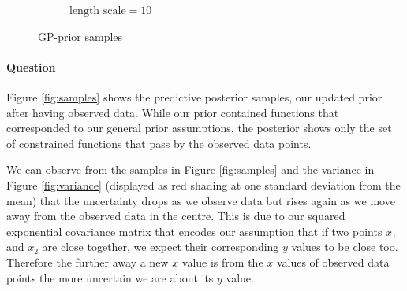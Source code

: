 \documentclass{article}
\newcounter{question}
\newcommand{\question}{\stepcounter{question}\paragraph{Question \thequestion}}
\begin{document}
\begin{figure}[H]
\begin{subfigure}[t]{0.3\linewidth}
		\caption{$\text{length scale} = 10$}
		\label{fig:10.l}
	\end{subfigure}
	\caption{GP-prior samples}
	\label{fig:GP-p}
\end{figure}
\question Figure \ref{fig:samples} shows the predictive posterior samples, our updated prior after having observed data. While our prior contained functions that corresponded to our general prior assumptions, the posterior shows only the set of constrained functions that pass by the observed data points.

We can observe from the samples in Figure \ref{fig:samples} and the variance in Figure \ref{fig:variance} (displayed as red shading at one standard deviation from the mean) that the uncertainty drops as we observe data but rises again as we move away from the observed data in the centre. This is due to our squared exponential covariance matrix that encodes our assumption that if two points $x_1$ and $x_2$ are close together, we expect their corresponding $y$ values to be close too. Therefore the further away a new $x$ value is from the $x$ values of observed data points the more uncertain we are about its $y$ value.
\end{document}
